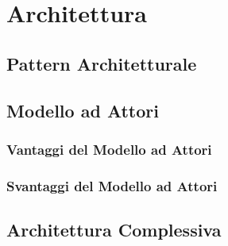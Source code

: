 
\newpage
\section{Architettura}

\subsection{Pattern Architetturale}

\subsection{Modello ad Attori}

\subsubsection{Vantaggi del Modello ad Attori}


\subsubsection{Svantaggi del Modello ad Attori}

\subsection{Architettura Complessiva}
